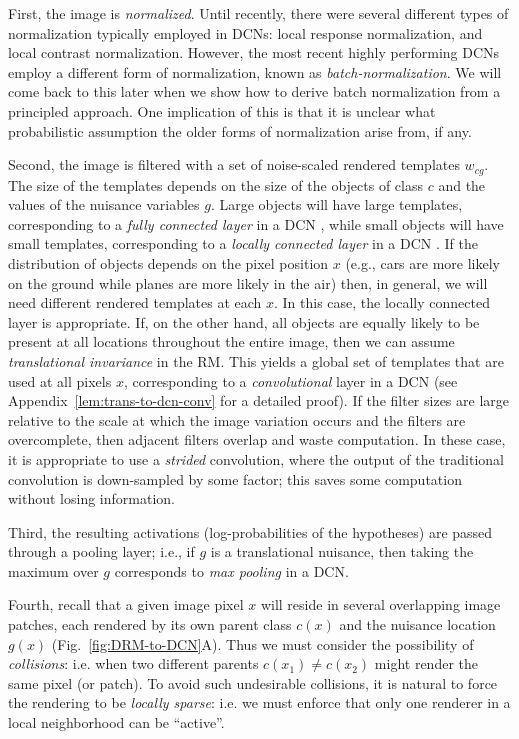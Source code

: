 \documentclass[12pt]{article}
\begin{document}
First, the image is {\em normalized}. Until recently, there were several different types of normalization typically employed in DCNs: local response normalization, and local contrast normalization\cite{Krizhevsky:2012wl, jarrett2009best}. However, the most recent highly performing DCNs employ a different form of normalization, known as \emph{batch-normalization}\cite{szegedy2014going}. We will come back to this later when we show how to derive batch normalization from a principled approach. One implication of this is that it is unclear what probabilistic assumption the older forms of normalization arise from, if any.

Second, the image is filtered with a set of noise-scaled rendered templates $w_{cg}$. The size of the templates depends on the size of the objects of class $c$ and the values of the nuisance variables $g$. Large objects will have large templates, corresponding to a {\em fully connected layer} in a DCN \cite{lecun1998gradient}, while small objects will have small templates, corresponding to a {\em locally connected layer} in a DCN \cite{wolfdeepface}. If the distribution of objects depends on the pixel position $x$ (e.g., cars are more likely on the ground while planes are more likely in the air) then, in general, we will need different rendered templates at each $x$. In this case, the locally connected layer is appropriate. 
If, on the other hand, all objects are equally likely to be present at all locations throughout the entire image, then we can assume {\it translational invariance} in the RM. This yields a global set of templates that are used at all pixels $x$, corresponding to a {\em convolutional} layer in a DCN \cite{lecun1998gradient} (see Appendix~\ref{lem:trans-to-dcn-conv} for a detailed proof). 
If the filter sizes are large relative to the scale at which the image variation occurs and the filters are overcomplete, then adjacent filters overlap and waste computation. In these case, it is appropriate to use a \emph{strided} convolution, where the output of the traditional convolution is down-sampled by some factor; this saves some computation without losing information.

Third, the resulting activations (log-probabilities of the hypotheses) are passed through a pooling layer; i.e., if $g$ is a translational nuisance, then taking the maximum over $g$ corresponds to {\it max pooling} in a DCN.

Fourth, recall that a given image pixel $x$ will reside in several overlapping image patches, each rendered by its own parent class $c(x)$ and the nuisance location $g(x)$ (Fig.~\ref{fig:DRM-to-DCN}A). Thus we must consider the possibility of {\em collisions}: i.e. when two different parents $c(x_{1}) \neq c(x_{2})$ might render the same pixel (or patch). To avoid such undesirable collisions, it is natural to force the rendering to be {\em locally sparse}: i.e. we must enforce that only one renderer in a local neighborhood can be ``active''. 
\end{document}

